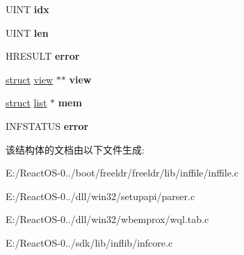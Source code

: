 \begin{DoxyCompactItemize}
U\+I\+NT {\bfseries idx}
\item 
\mbox{\label{structparser_a0b50da972673b0eddebb0446a338d0e6}} 
U\+I\+NT {\bfseries len}
\item 
\mbox{\label{structparser_aa7e2e4929b8028794fe9f24d416c03dc}} 
H\+R\+E\+S\+U\+LT {\bfseries error}
\item 
\mbox{\label{structparser_a324878c2b1db5ea91058b9a7b519c416}} 
\hyperlink{interfacestruct}{struct} \hyperlink{structview}{view} $\ast$$\ast$ {\bfseries view}
\item 
\mbox{\label{structparser_af4decec01c2184ef0a0c640d7f041a75}} 
\hyperlink{interfacestruct}{struct} \hyperlink{classlist}{list} $\ast$ {\bfseries mem}
\item 
\mbox{\label{structparser_a48158a123e344e9752bf123f86046fb9}} 
I\+N\+F\+S\+T\+A\+T\+US {\bfseries error}
\end{DoxyCompactItemize}


该结构体的文档由以下文件生成\+:\begin{DoxyCompactItemize}
\item 
E\+:/\+React\+O\+S-\/0../boot/freeldr/freeldr/lib/inffile/inffile.\+c\item 
E\+:/\+React\+O\+S-\/0../dll/win32/setupapi/parser.\+c\item 
E\+:/\+React\+O\+S-\/0../dll/win32/wbemprox/wql.\+tab.\+c\item 
E\+:/\+React\+O\+S-\/0../sdk/lib/inflib/infcore.\+c\end{DoxyCompactItemize}
